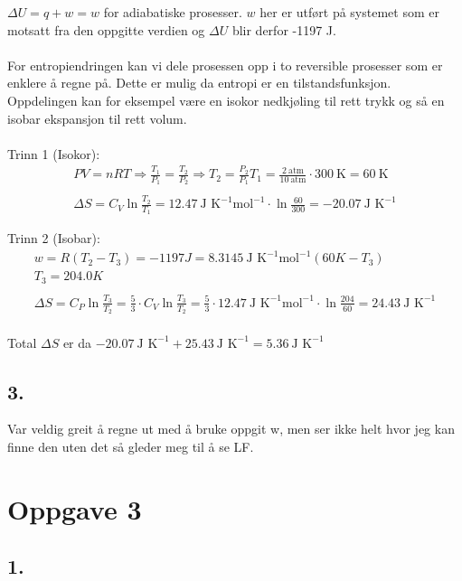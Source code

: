 \(\Delta U = q + w = w\) for adiabatiske prosesser. \(w\) her er utført på systemet som er motsatt fra den oppgitte verdien og \(\Delta U\) blir derfor -1197 J.
\\
\\
For entropiendringen kan vi dele prosessen opp i to reversible prosesser som er enklere å regne på. Dette er mulig da entropi er en tilstandsfunksjon. Oppdelingen kan for eksempel være en isokor nedkjøling til rett trykk og så en isobar ekspansjon til rett volum.
\\
\\
Trinn 1 (Isokor):
\begin{gather*}
	PV = nRT
	\Rightarrow
	\frac{T_1}{P_1} = \frac{T_2}{P_2}
	\Rightarrow
	T_2 = \frac{P_2}{P_1} T_1
	=
	\frac{2\ \text{atm}}{10\ \text{atm}} \cdot 300\ \text{K} = 60\ \text{K}
	\\
	\\
	\Delta S = C_V \ln{\frac{T_2}{T_1}} =
	12.47\ \text{J K}^{-1} \text{mol}^{-1} \cdot \ln{\frac{60}{300}} =
	-20.07\ \text{J K}^{-1}
\end{gather*}

Trinn 2 (Isobar):
\begin{gather*}
	w = R (T_2 - T_3) =
	- 1197 J = 8.3145\ \text{J K}^{-1} \text{mol}^{-1} (60 K - T_3)
	\\
	T_3 = 204.0 K
	\\
	\\
	\Delta S = C_P \ln{\frac{T_3}{T_2}} =
	\frac{5}{3} \cdot C_V \ln{\frac{T_3}{T_2}} =
	\frac{5}{3} \cdot 12.47\ \text{J K}^{-1} \text{mol}^{-1} \cdot
	\ln{\frac{204}{60}} = 24.43\ \text{J K}^{-1}
\end{gather*}
\\
Total \(\Delta S\) er da \(-20.07\ \text{J K}^{-1} + 25.43\ \text{J K}^{-1} = 5.36\ \text{J K}^{-1}\)

\subsection*{3.}

Var veldig greit å regne ut med å bruke oppgit w, men ser ikke helt hvor jeg kan finne den uten det så gleder meg til å se LF.


\section*{Oppgave 3}

\subsection*{1.}

